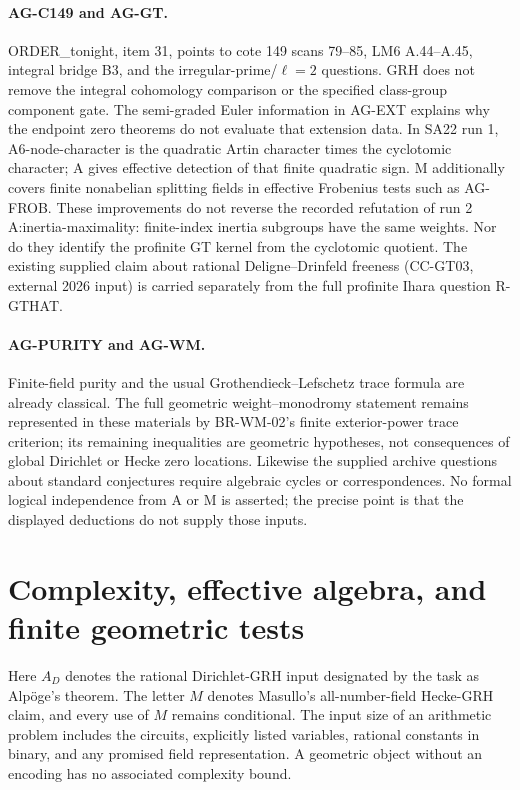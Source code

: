 \documentclass[11pt,a4paper]{article}
\begin{document}
\paragraph{AG-C149 and AG-GT.} ORDER\_tonight, item 31, points to cote
149 scans 79--85, LM6 A.44--A.45, integral bridge B3, and the
irregular-prime/$\ell=2$ questions. GRH does not remove the integral
cohomology comparison or the specified class-group component gate.
The semi-graded Euler information in AG-EXT explains why the endpoint
zero theorems do not evaluate that extension data. In SA22 run 1,
A6-node-character is the quadratic Artin character times the cyclotomic
character; A gives effective detection of that finite quadratic sign.
M additionally covers finite nonabelian splitting fields in effective
Frobenius tests such as AG-FROB. These improvements do not reverse the
recorded refutation of run 2 A:inertia-maximality: finite-index inertia
subgroups have the same weights. Nor do they identify the profinite GT
kernel from the cyclotomic quotient. The existing supplied claim about
rational Deligne--Drinfeld freeness (CC-GT03, external 2026 input) is
carried separately from the full profinite Ihara question R-GTHAT.

\paragraph{AG-PURITY and AG-WM.} Finite-field purity and the usual
Grothendieck--Lefschetz trace formula are already classical. The full
geometric weight--monodromy statement remains represented in these
materials by BR-WM-02's finite exterior-power trace criterion; its
remaining inequalities are geometric hypotheses, not consequences of
global Dirichlet or Hecke zero locations. Likewise the supplied archive
questions about standard conjectures require algebraic cycles or
correspondences. No formal logical independence from A or M is asserted;
the precise point is that the displayed deductions do not supply those
inputs.


\section{Complexity, effective algebra, and finite geometric tests}
\label{sec:complexity}

Here $A_D$ denotes the rational Dirichlet-GRH input designated by the task as
Alp\"oge's theorem. The letter $M$ denotes Masullo's all-number-field Hecke-GRH
claim, and every use of $M$ remains conditional. The input size of an arithmetic
problem includes the circuits, explicitly listed variables, rational constants
in binary, and any promised field representation. A geometric object without
an encoding has no associated complexity bound.
\end{document}
